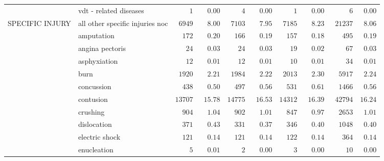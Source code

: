 \documentclass[9pt, oneside]{article}   	%
\begin{document}
\begin{longtable}{p{1.8in}p{2.2in}cccccccc}
 & vdt - related diseases  & $\phantom{0000}1$ & $\phantom{00}0.00$ & $\phantom{0000}4$ & $\phantom{00}0.00$ & $\phantom{0000}1$ & $\phantom{00}0.00$ & $\phantom{00000}6$ & $\phantom{0}0.00$ \\
SPECIFIC INJURY & all other specific injuries noc  & $\phantom{0}6949$ & $\phantom{00}8.00$ & $\phantom{0}7103$ & $\phantom{00}7.95$ & $\phantom{0}7185$ & $\phantom{00}8.23$ & $\phantom{0}21237$ & $\phantom{0}8.06$ \\
 & amputation  & $\phantom{00}172$ & $\phantom{00}0.20$ & $\phantom{00}166$ & $\phantom{00}0.19$ & $\phantom{00}157$ & $\phantom{00}0.18$ & $\phantom{000}495$ & $\phantom{0}0.19$ \\
 & angina pectoris  & $\phantom{000}24$ & $\phantom{00}0.03$ & $\phantom{000}24$ & $\phantom{00}0.03$ & $\phantom{000}19$ & $\phantom{00}0.02$ & $\phantom{0000}67$ & $\phantom{0}0.03$ \\
 & asphyxiation  & $\phantom{000}12$ & $\phantom{00}0.01$ & $\phantom{000}12$ & $\phantom{00}0.01$ & $\phantom{000}10$ & $\phantom{00}0.01$ & $\phantom{0000}34$ & $\phantom{0}0.01$ \\
 & burn  & $\phantom{0}1920$ & $\phantom{00}2.21$ & $\phantom{0}1984$ & $\phantom{00}2.22$ & $\phantom{0}2013$ & $\phantom{00}2.30$ & $\phantom{00}5917$ & $\phantom{0}2.24$ \\
 & concussion  & $\phantom{00}438$ & $\phantom{00}0.50$ & $\phantom{00}497$ & $\phantom{00}0.56$ & $\phantom{00}531$ & $\phantom{00}0.61$ & $\phantom{00}1466$ & $\phantom{0}0.56$ \\
 & contusion  & $13707$ & $\phantom{0}15.78$ & $14775$ & $\phantom{0}16.53$ & $14312$ & $\phantom{0}16.39$ & $\phantom{0}42794$ & $16.24$ \\
 & crushing  & $\phantom{00}904$ & $\phantom{00}1.04$ & $\phantom{00}902$ & $\phantom{00}1.01$ & $\phantom{00}847$ & $\phantom{00}0.97$ & $\phantom{00}2653$ & $\phantom{0}1.01$ \\
 & dislocation  & $\phantom{00}371$ & $\phantom{00}0.43$ & $\phantom{00}331$ & $\phantom{00}0.37$ & $\phantom{00}346$ & $\phantom{00}0.40$ & $\phantom{00}1048$ & $\phantom{0}0.40$ \\
 & electric shock  & $\phantom{00}121$ & $\phantom{00}0.14$ & $\phantom{00}121$ & $\phantom{00}0.14$ & $\phantom{00}122$ & $\phantom{00}0.14$ & $\phantom{000}364$ & $\phantom{0}0.14$ \\
 & enucleation  & $\phantom{0000}5$ & $\phantom{00}0.01$ & $\phantom{0000}2$ & $\phantom{00}0.00$ & $\phantom{0000}3$ & $\phantom{00}0.00$ & $\phantom{0000}10$ & $\phantom{0}0.00$ \\

\end{longtable}
\end{document}
